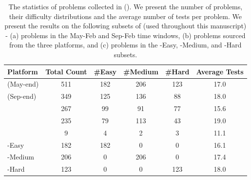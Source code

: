 \begin{table}[!b]
    \centering
    \begin{tabular}{lccccc}
    \hline
    Platform & Total Count & \#Easy & \#Medium & \#Hard & Average Tests \\
    \hline
    \lcb{} (May-end) & 511 & 182 & 206 & 123 & 17.0 \\
    \lcb{} (Sep-end) & 349 & 125 & 136 & 88 & 18.0 \\
    \hline
    \atcoder{} & 267 & 99 & 91 & 77 & 15.6 \\
    \leetcode{} & 235 & 79 & 113 & 43 & 19.0 \\
    \codeforces{} & 9 & 4 & 2 & 3 & 11.1 \\
    \hline
    \lcb{}-Easy & 182 & 182 & 0 & 0 & 16.1 \\
    \lcb{}-Medium & 206 & 0 & 206 & 0 & 17.4 \\
    \lcb{}-Hard & 123 & 0 & 0 & 123 & 18.0 \\
    \hline
\end{tabular}
    \caption{
        The statistics of problems collected in \livecodebench{} (\lcb{}). 
        We present the number of problems, their difficulty distributions and the average number of tests per problem.
        We present the results on the following subsets of \livecodebench{} (used throughout this manuscript) - (a) problems in the  May-Feb and Sep-Feb time windows, (b) problems sourced from the three platforms, and (c) problems in the \lcb{}-Easy, \lcb{}-Medium, and \lcb{}-Hard subsets.}
        \label{tab:platform_comparison}
\end{table}
